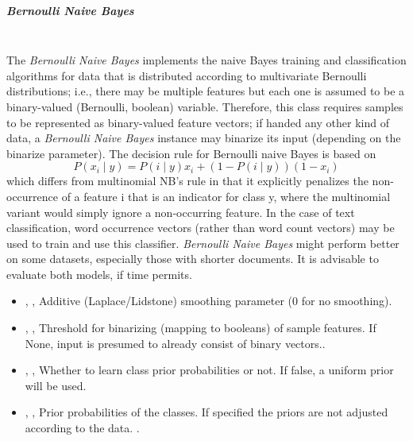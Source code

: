 \subparagraph{Bernoulli Naive Bayes}
\mbox{}
\\The \textit{Bernoulli Naive Bayes} implements the naive Bayes training and
classification algorithms for data that is distributed according to multivariate
Bernoulli distributions; i.e., there may be multiple features but each one is
assumed to be a binary-valued (Bernoulli, boolean) variable.
%
Therefore, this class requires samples to be represented as binary-valued
feature vectors; if handed any other kind of data, a \textit{Bernoulli Naive
  Bayes} instance may binarize its input (depending on the binarize parameter).
%
The decision rule for Bernoulli naive Bayes is based on
\begin{equation}
P(x_i \mid y) = P(i \mid y) x_i + (1 - P(i \mid y)) (1 - x_i)
\end{equation}
which differs from multinomial NB’s rule in that it explicitly penalizes the
non-occurrence of a feature i that is an indicator for class y, where the
multinomial variant would simply ignore a non-occurring feature.
%
In the case of text classification, word occurrence vectors (rather than word
count vectors) may be used to train and use this classifier.
%
\textit{Bernoulli Naive Bayes} might perform better on some datasets, especially
those with shorter documents.
%
It is advisable to evaluate both models, if time permits.
%
\begin{itemize}
  \item {} , ,
  Additive (Laplace/Lidstone) smoothing parameter (0 for no smoothing).
  \item {} , ,
  Threshold for binarizing (mapping to booleans) of sample features.
  If None, input is presumed to already consist of binary vectors..
  \item {} , ,
  Whether to learn class prior probabilities or not.
  If false, a uniform prior will be used.
  \item {} , ,
  Prior probabilities of the classes.
  If specified the priors are not adjusted according to the data.
  .
\end{itemize}
